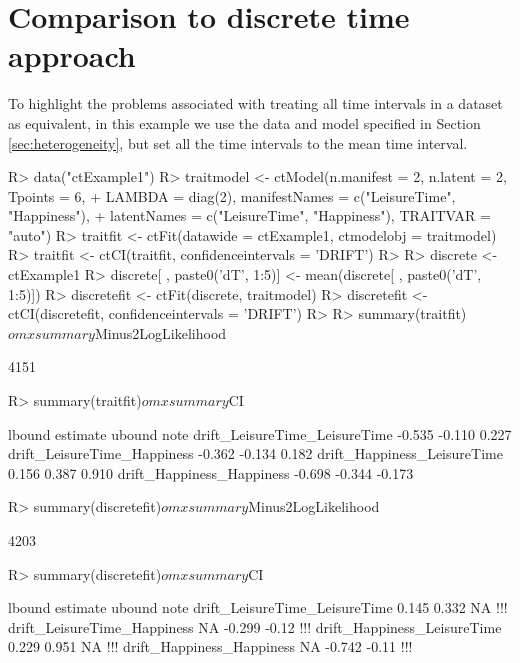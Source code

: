 \documentclass[nojss]{jss}\usepackage[]{graphicx}\usepackage[]{color}
\begin{document}
\section{Comparison to discrete time approach}\label{appendix:discretecomparison}\nopagebreak
To highlight the problems associated with treating all time intervals in a dataset as equivalent, in this example we use the data and model specified in Section \ref{sec:heterogeneity}, but set all the time intervals to the mean time interval. 

\begin{Schunk}
\begin{Sinput}
R> data("ctExample1")
R> traitmodel <- ctModel(n.manifest = 2, n.latent = 2, Tpoints = 6, 
+   LAMBDA = diag(2), manifestNames = c("LeisureTime", "Happiness"), 
+   latentNames = c("LeisureTime", "Happiness"), TRAITVAR = "auto")
R> traitfit <- ctFit(datawide = ctExample1, ctmodelobj = traitmodel)
R> traitfit <- ctCI(traitfit, confidenceintervals = 'DRIFT')
R> 
R> discrete <- ctExample1
R> discrete[ , paste0('dT', 1:5)] <- mean(discrete[ , paste0('dT', 1:5)])
R> discretefit <- ctFit(discrete, traitmodel)
R> discretefit <- ctCI(discretefit, confidenceintervals = 'DRIFT')
R> 
R> summary(traitfit)$omxsummary$Minus2LogLikelihood
\end{Sinput}
\begin{Soutput}
[1] 4151
\end{Soutput}
\begin{Sinput}
R> summary(traitfit)$omxsummary$CI
\end{Sinput}
\begin{Soutput}
                              lbound estimate ubound note
drift_LeisureTime_LeisureTime -0.535   -0.110  0.227     
drift_LeisureTime_Happiness   -0.362   -0.134  0.182     
drift_Happiness_LeisureTime    0.156    0.387  0.910     
drift_Happiness_Happiness     -0.698   -0.344 -0.173     
\end{Soutput}
\begin{Sinput}
R> summary(discretefit)$omxsummary$Minus2LogLikelihood
\end{Sinput}
\begin{Soutput}
[1] 4203
\end{Soutput}
\begin{Sinput}
R> summary(discretefit)$omxsummary$CI
\end{Sinput}
\begin{Soutput}
                              lbound estimate ubound note
drift_LeisureTime_LeisureTime  0.145    0.332     NA  !!!
drift_LeisureTime_Happiness       NA   -0.299  -0.12  !!!
drift_Happiness_LeisureTime    0.229    0.951     NA  !!!
drift_Happiness_Happiness         NA   -0.742  -0.11  !!!
\end{Soutput}
\end{Schunk}
\end{document}
